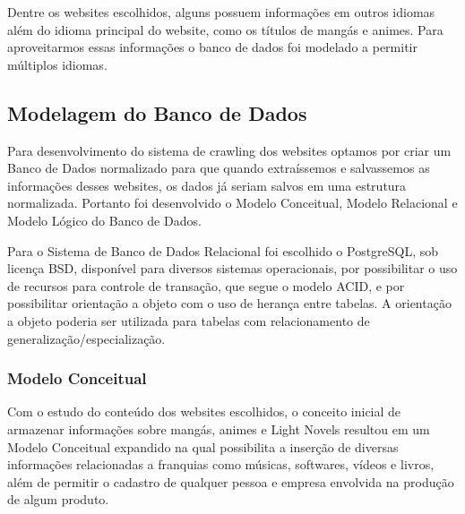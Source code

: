 \documentclass[12pt]{article}
\begin{document}
Dentre os websites escolhidos, alguns possuem informações em outros idiomas além do idioma principal do website, como os títulos de mangás e animes. Para aproveitarmos essas informações o banco de dados foi modelado a permitir múltiplos idiomas. 


\subsection{Modelagem do Banco de Dados}

Para desenvolvimento do sistema de crawling dos websites optamos por criar um Banco de Dados normalizado para que quando extraíssemos e salvassemos as informações desses websites, os dados já seriam salvos em uma estrutura normalizada. 
Portanto foi desenvolvido o Modelo Conceitual, Modelo Relacional e Modelo Lógico do Banco de Dados. 

Para o Sistema de Banco de Dados Relacional foi escolhido o PostgreSQL, sob licença BSD, disponível para diversos sistemas operacionais, por possibilitar o uso de recursos para controle de transação, que segue o modelo ACID, e por possibilitar orientação a objeto com o uso de herança entre tabelas. A orientação a objeto poderia ser utilizada para tabelas com relacionamento de generalização/especialização. 


\subsubsection{Modelo Conceitual}

Com o estudo do conteúdo dos websites escolhidos, o conceito inicial de armazenar informações sobre mangás, animes e Light Novels resultou em um Modelo Conceitual expandido na qual possibilita a inserção de diversas informações relacionadas a franquias como músicas, softwares, vídeos e livros, além de permitir o cadastro de qualquer pessoa e empresa envolvida na produção de algum produto.
\end{document}
